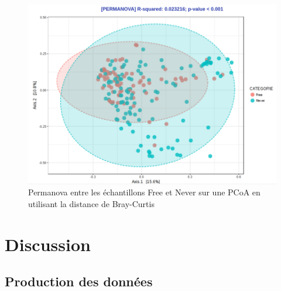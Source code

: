 \documentclass[12pt,a4paper]{article}
\begin{document}
\begin{figure}[t]
\begin{center}
\includegraphics[scale=0.50]{img/pcoa.png}\hfill
\end{center}
\caption{Permanova entre les échantillons Free et Never sur une PCoA en utilisant la distance de Bray-Curtis}
\label{pcoa}
\end{figure}

\newpage
\section{Discussion}
\subsection{Production des données}
\end{document}
